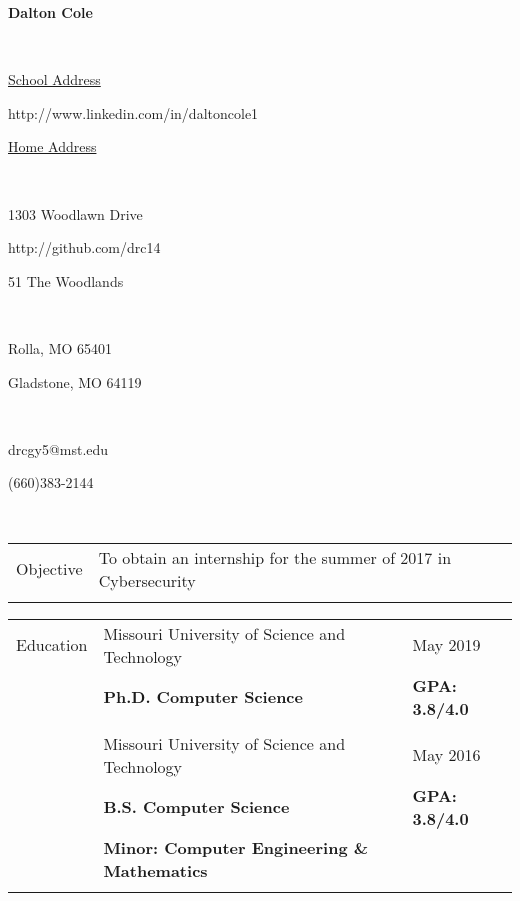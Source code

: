 \documentclass[10.5pt, arial]{article}
\newcommand\textbox[1]{%
  \parbox{.333\textwidth}{#1}%
}
\begin{document}

\noindent\textbox{\hfill}\textbox{\hfil \textbf{Dalton Cole}\hfil}\textbox{\hfill} \\
\noindent\textbox{\underline{School Address}\hfill}\textbox{\hfil http://www.linkedin.com/in/daltoncole1\hfil}\textbox{\hfill \underline{Home Address}} \\
\noindent\textbox{1303 Woodlawn Drive\hfill}\textbox{\hfil http://github.com/drc14\hfil}\textbox{\hfill 51 The Woodlands} \\
\noindent\textbox{Rolla, MO 65401\hfill}\textbox{\hfil \hfil}\textbox{\hfill Gladstone, MO 64119} \\
\noindent\textbox{drcgy5@mst.edu\hfill}\textbox{\hfil \hfil}\textbox{\hfill (660)383-2144} \\
\noindent\makebox[\linewidth]{\rule{\textwidth}{.4pt}} 

\begin{tabular}{p{1.5cm} p{12.9cm} r}
Objective  	& To obtain an internship for the summer of 2017 in Cybersecurity 	& 						\\ \\
\end{tabular}

\begin{tabular}{p{1.5cm} p{12.9cm} l}
Education  	& Missouri University of Science and Technology 					& May 2019 				\\
			& \textbf{Ph.D. Computer Science} 									& \textbf{GPA: 3.8/4.0}	\\ \\

		  	& Missouri University of Science and Technology 					& May 2016 				\\
			& \textbf{B.S. Computer Science} 									& \textbf{GPA: 3.8/4.0} \\
			& \textbf{Minor: Computer Engineering \& Mathematics} 										\\ \\
\end{tabular}
\end{document}
